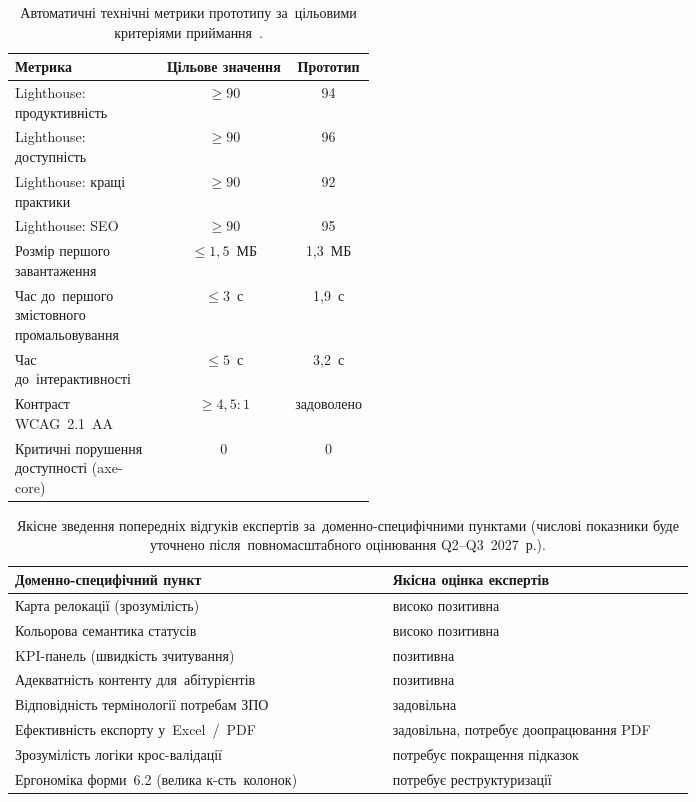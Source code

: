 \begin{table}[htbp]
\centering
\caption{Автоматичні технічні метрики прототипу за~цільовими критеріями приймання~\cite{NMTsPTO2025}.}
\label{tab:p3-tech-eval}
\small
\setlength\tabcolsep{4pt}
\renewcommand{\arraystretch}{1.05}
\begin{tabular}{|p{0.42\linewidth}|c|c|}
\hline
\textbf{Метрика} & \textbf{Цільове значення} & \textbf{Прототип} \\
\hline
Lighthouse: продуктивність & $\geq 90$ & 94 \\ \hline
Lighthouse: доступність & $\geq 90$ & 96 \\ \hline
Lighthouse: кращі практики & $\geq 90$ & 92 \\ \hline
Lighthouse: SEO & $\geq 90$ & 95 \\ \hline
Розмір першого завантаження & $\leq 1{,}5$~МБ & 1,3~МБ \\ \hline
Час до~першого змістовного промальовування & $\leq 3$~с & 1,9~с \\ \hline
Час до~інтерактивності & $\leq 5$~с & 3,2~с \\ \hline
Контраст WCAG~2.1~AA & $\geq 4{,}5{:}1$ & задоволено \\ \hline
Критичні порушення доступності (axe-core) & 0 & 0 \\ \hline
\end{tabular}
\end{table}

\begin{table}[htbp]
\centering
\caption{Якісне зведення попередніх відгуків експертів за~доменно-специфічними пунктами (числові показники буде уточнено після~повномасштабного оцінювання Q2--Q3~2027~р.).}
\label{tab:p3-expert}
\small
\setlength\tabcolsep{4pt}
\renewcommand{\arraystretch}{1.05}
\begin{tabular}{|p{0.50\linewidth}|p{0.40\linewidth}|}
\hline
\textbf{Доменно-специфічний пункт} & \textbf{Якісна оцінка експертів} \\
\hline
Карта релокації (зрозумілість) & високо позитивна \\ \hline
Кольорова семантика статусів & високо позитивна \\ \hline
KPI-панель (швидкість зчитування) & позитивна \\ \hline
Адекватність контенту для~абітурієнтів & позитивна \\ \hline
Відповідність термінології потребам ЗПО & задовільна \\ \hline
Ефективність експорту у~Excel~/~PDF & задовільна, потребує доопрацювання PDF \\ \hline
Зрозумілість логіки крос-валідації & потребує покращення підказок \\ \hline
Ергономіка форми~6.2 (велика к-сть~колонок) & потребує реструктуризації \\ \hline
\end{tabular}
\end{table}


